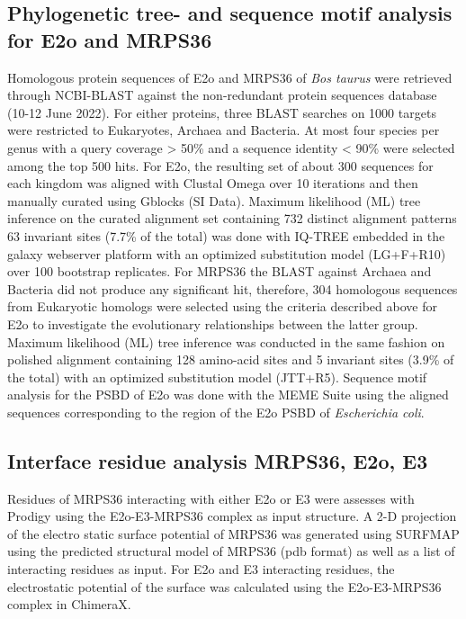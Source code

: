 \subsection*{Phylogenetic tree- and sequence motif analysis for E2o and MRPS36}
Homologous protein sequences of E2o and MRPS36 of \emph{Bos taurus} were retrieved through NCBI-BLAST against the non-redundant protein sequences database (10-12 June 2022). For either proteins, three BLAST searches on 1000 targets were restricted to Eukaryotes, Archaea and Bacteria. At most four species per genus with a query coverage > 50\% and a sequence identity < 90\% were selected among the top 500 hits. For E2o, the resulting set of about 300 sequences for each kingdom was aligned with Clustal Omega \cite{Sievers_2018} over 10 iterations and then manually curated using Gblocks \cite{Talavera_2007} (SI Data). Maximum likelihood (ML) tree inference on the curated alignment set containing 732 distinct alignment patterns 63 invariant sites (7.7\% of the total)  was done with IQ-TREE \cite{Minh_2020} embedded in the galaxy webserver platform \cite{Afgan_2016} with an optimized substitution model (LG+F+R10) over 100 bootstrap replicates. For MRPS36 the BLAST against Archaea and Bacteria did not produce any significant hit, therefore, 304 homologous sequences from Eukaryotic homologs were selected using the criteria described above for E2o to investigate the evolutionary relationships between the latter group. Maximum likelihood (ML) tree inference  was conducted in the same fashion on polished alignment containing 128 amino-acid sites and 5 invariant sites (3.9\% of the total) with an optimized substitution model (JTT+R5). Sequence motif analysis for the PSBD of E2o was done with the MEME Suite \cite{Bailey_2015} using the aligned sequences corresponding to the region of the E2o PSBD of \emph{Escherichia coli}.

\subsection*{Interface residue analysis MRPS36, E2o, E3}
Residues of MRPS36 interacting with either E2o or E3 were assesses with Prodigy \cite{Vangone_2015} using the E2o-E3-MRPS36 complex as input structure. A 2-D projection of the electro static surface potential of MRPS36 was generated using SURFMAP \cite{Schweke_2022} using the predicted structural model of MRPS36 (pdb format) as well as a list of interacting residues as input. For E2o and E3 interacting residues, the electrostatic potential of the surface was calculated using the E2o-E3-MRPS36 complex in ChimeraX.

